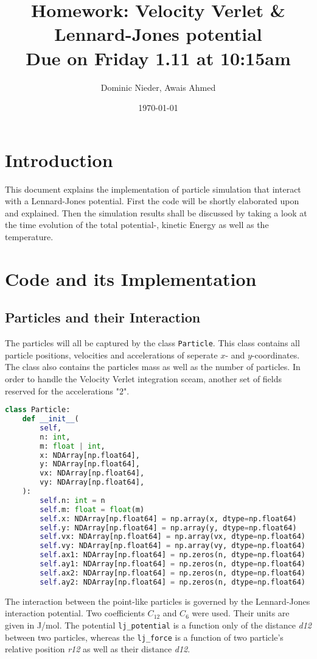 \documentclass{article}
\title{
    \vspace{2in}
    \textmd{\textbf{Homework: Velocity Verlet \& Lennard-Jones potential}}\\
    \normalsize\vspace{0.1in}\small{Due on Friday 1.11 at 10:15am}\\
    \vspace{0.1in}
    \vspace{3in}
}
\author{Dominic Nieder, Awais Ahmed}
\date{\today}
\begin{document}
\maketitle

\section{Introduction}

This document explains the implementation of particle simulation that interact with a Lennard-Jones potential. First the code will be shortly elaborated upon and explained. Then the simulation results shall be discussed by taking a look at the time evolution of the total potential-, kinetic Energy as well as the temperature.



\section{Code and its Implementation}

\subsection{Particles and their Interaction} \label{ParticlesAndInteractions}

The particles will all be captured by the class \texttt{Particle}. This class contains all particle positions, velocities and accelerations of seperate $x$- and $y$-coordinates. The class also contains the particles mass as well as the number of particles. In order to handle the Velocity Verlet integration sceam, another set of fields reserved for the accelerations "$2$".

\begin{lstlisting}[language=Python, caption=Particle class]
class Particle:
    def __init__(
        self,
        n: int,
        m: float | int,
        x: NDArray[np.float64],
        y: NDArray[np.float64],
        vx: NDArray[np.float64],
        vy: NDArray[np.float64],
    ):
        self.n: int = n
        self.m: float = float(m)
        self.x: NDArray[np.float64] = np.array(x, dtype=np.float64)
        self.y: NDArray[np.float64] = np.array(y, dtype=np.float64)
        self.vx: NDArray[np.float64] = np.array(vx, dtype=np.float64)
        self.vy: NDArray[np.float64] = np.array(vy, dtype=np.float64)
        self.ax1: NDArray[np.float64] = np.zeros(n, dtype=np.float64)
        self.ay1: NDArray[np.float64] = np.zeros(n, dtype=np.float64)
        self.ax2: NDArray[np.float64] = np.zeros(n, dtype=np.float64)
        self.ay2: NDArray[np.float64] = np.zeros(n, dtype=np.float64)
\end{lstlisting}
\pagebreak
The interaction between the point-like particles is governed by the Lennard-Jones interaction potential. Two coefficients $C_{12}$ and $C_6$ were used. Their units are given in J/mol. The potential \texttt{lj_potential} is a function only of the distance \textit{d12} between two particles, whereas the \texttt{lj_force} is a function of two particle's relative position \textit{r12} as well as their distance \textit{d12}.
\end{document}

